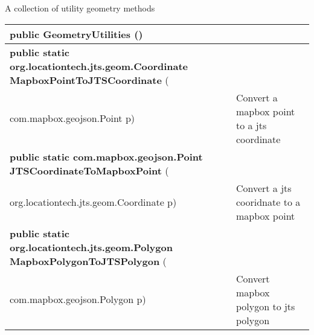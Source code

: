  { A collection of utility geometry methods
 
\begin{tabular}{ p{3in}|m{3.4in}}
\textbf{public GeometryUtilities} () & \\ \hline 
\textbf{public static org.locationtech.jts.geom.Coordinate MapboxPointToJTSCoordinate } (\\ \hspace*{ 5pt} com.mapbox.geojson.Point p) & Convert a mapbox point to a jts coordinate\\ \hline 
\textbf{public static com.mapbox.geojson.Point JTSCoordinateToMapboxPoint } (\\ \hspace*{ 5pt} org.locationtech.jts.geom.Coordinate p) & Convert a jts cooridnate to a mapbox point\\ \hline 
\textbf{public static org.locationtech.jts.geom.Polygon MapboxPolygonToJTSPolygon } (\\ \hspace*{ 5pt} com.mapbox.geojson.Polygon p) & Convert mapbox polygon to jts polygon\\ \hline 
\end{tabular}
}
